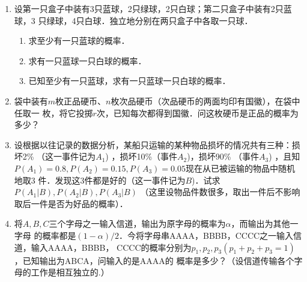 \documentclass[10pt,a4paper]{article}
\begin{document}
\begin{enumerate}
    \item 设第一只盒子中装有3只蓝球，2只绿球，2只白球；第二只盒子中装有2只蓝球，3
    只绿球，4只白球．独立地分别在两只盒子中各取一只球．
    \begin{enumerate}
        \item 求至少有一只蓝球的概率．
        \item 求有一只蓝球一只白球的概率．
        \item 已知至少有一只蓝球，求有一只蓝球一只白球的概率．
    \end{enumerate}


    \item 袋中装有$m$枚正品硬币、$n$枚次品硬币（次品硬币的两面均印有国徽），在袋中任取一
    枚，将它投掷$r$次，已知每次都得到国徽．问这枚硬币是正品的概率为多少？


    \item 设根据以往记录的数据分析，某船只运输的某种物品损坏的情况共有三种：损坏2\%
    （这一事件记为$A_1$) ，损坏10\%（事件$A_2$)，损坏90\% （事件$A_3$) ，且知
    $P(A_1)=0.8,P(A_2)=0.15,P(A_3)=0.05$现在从已被运输的物品中随机地取3
    件．发现这3件都是好的（这一事件记为$B$)．试求$P(A_1|B),P(A_2|B),P(A_3|B)$
     （这里设物品件数很多，取出一件后不影响取后一件是否为好品的概率）．


     \item 将$A,B,C$三个字母之一输入信道，输出为原字母的概率为$\alpha$，而输出为其他一字母
     的概率都是$(1-\alpha)/2$．今将字母串AAAA，BBBB，CCCC之一输入信道，输入AAAA，BBBB，
     CCCC的概率分别为$p_1,p_2,p_3(p_1+p_2+p_3=1)$，已知输出为ABCA，问输入的是AAAA的
     概率是多少？（设信道传输各个字母的工作是相互独立的.）

\end{enumerate}
\end{document}
